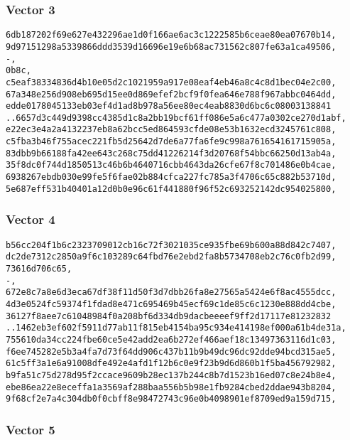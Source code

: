 \documentclass[
]{article}
\begin{document}
\hypertarget{vector-3-1}{%
\subsubsection{Vector 3}\label{vector-3-1}}

\begin{verbatim}
6db187202f69e627e432296ae1d0f166ae6ac3c1222585b6ceae80ea07670b14,
9d97151298a5339866ddd3539d16696e19e6b68ac731562c807fe63a1ca49506,
-,
0b8c,
c5eaf38334836d4b10e05d2c1021959a917e08eaf4eb46a8c4c8d1bec04e2c00,
67a348e256d908eb695d15ee0d869efef2bcf9f0fea646e788f967abbc0464dd,
edde0178045133eb03ef4d1ad8b978a56ee80ec4eab8830d6bc6c08003138841
..6657d3c449d9398cc4385d1c8a2bb19bcf61ff086e5a6c477a0302ce270d1abf,
e22ec3e4a2a4132237eb8a62bcc5ed864593cfde08e53b1632ecd3245761c808,
c5fba3b46f755acec221fb5d25642d7de6a77fa6fe9c998a761654161715905a,
83dbb9b66188fa42ee643c268c75dd41226214f3d20768f54bbc66250d13ab4a,
35f8dc0f744d1850513c46b6b4640716cbb4643da26cfe67f8c701486e0b4cae,
6938267ebdb030e99fe5f6fae02b884cfca227fc785a3f4706c65c882b53710d,
5e687eff531b40401a12d0b0e96c61f441880f96f52c693252142dc954025800,
\end{verbatim}

\hypertarget{vector-4-1}{%
\subsubsection{Vector 4}\label{vector-4-1}}

\begin{verbatim}
b56cc204f1b6c2323709012cb16c72f3021035ce935fbe69b600a88d842c7407,
dc2de7312c2850a9f6c103289c64fbd76e2ebd2fa8b5734708eb2c76c0fb2d99,
73616d706c65,
-,
672e8c7a8e6d3eca67df38f11d50f3d7dbb26fa8e27565a5424e6f8ac4555dcc,
4d3e0524fc59374f1fdad8e471c695469b45ecf69c1de85c6c1230e888dd4cbe,
36127f8aee7c61048984f0a208bf6d334db9dacbeeeef9ff2d17117e81232832
..1462eb3ef602f5911d77ab11f815eb4154ba95c934e414198ef000a61b4de31a,
755610da34cc224fbe60ce5e42add2ea6b272ef466aef18c13497363116d1c03,
f6ee745282e5b3a4fa7d73f64dd906c437b11b9b49dc96dc92dde94bcd315ae5,
61c5ff3a1e6a91008dfe492e4afd1f12b6c0e9f23b9d6d860b1f5ba456792982,
b9fa51c75d278d95f2ccace9609b28ec137b244c8b7d1523b16ed07c8e24b8e4,
ebe86ea22e8eceffa1a3569af288baa556b5b98e1fb9284cbed2ddae943b8204,
9f68cf2e7a4c304db0f0cbff8e98472743c96e0b4098901ef8709ed9a159d715,
\end{verbatim}

\hypertarget{vector-5-1}{%
\subsubsection{Vector 5}\label{vector-5-1}}
\end{document}
